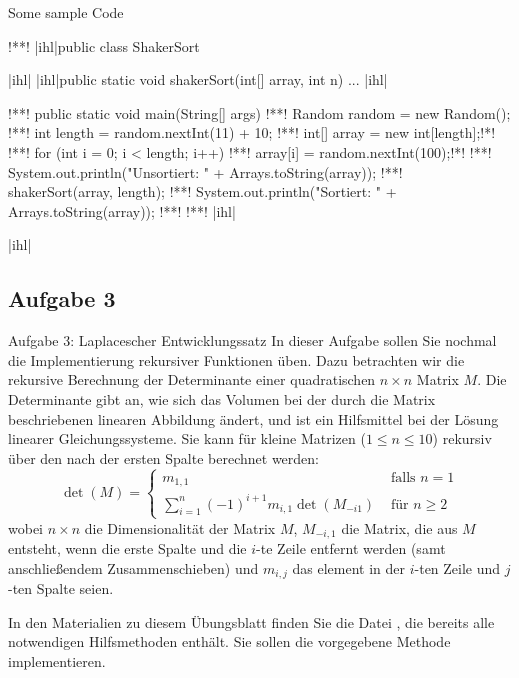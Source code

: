 \begin{frame}[c,fragile]{Some sample Code}
\SetupLstHl
\begin{plainjava}
!**!
|ihl|public class ShakerSort {|ihl|
    |ihl|public static void shakerSort(int[] array, int n) { ... }|ihl|

!**!    public static void main(String[] args) {
!**!        Random random = new Random();
!**!        int length = random.nextInt(11) + 10;
!**!        int[] array = new int[length];!*\smallskip*!
!**!        for (int i = 0; i < length; i++)
!**!           array[i] = random.nextInt(100);!*\smallskip*!
!**!        System.out.println("Unsortiert: " + Arrays.toString(array));
!**!        shakerSort(array, length);
!**!        System.out.println("Sortiert: " + Arrays.toString(array));
!**!    }!**!
|ihl|}|ihl|
\end{plainjava}
\end{frame}

\subsection{Aufgabe 3}
\begin{frame}[c]{Aufgabe 3: Laplacescher Entwicklungssatz}
    In dieser Aufgabe sollen Sie nochmal die Implementierung rekursiver Funktionen üben. Dazu betrachten wir die
    rekursive Berechnung der Determinante einer quadratischen \(n \times n\) Matrix \(M\). Die Determinante gibt an, wie sich
    das Volumen bei der durch die Matrix beschriebenen linearen Abbildung ändert, und ist ein Hilfsmittel bei der
    Lösung linearer Gleichungssysteme. Sie kann für kleine Matrizen (\(1 \leq n \leq 10\)) rekursiv über den  nach der ersten Spalte berechnet werden:
    \begin{equation*}
        \det(M) = \begin{cases}
            m_{1,1} & \text{ falls } n = 1\\
            \sum_{i = 1}^n (-1)^{i + 1} m_{i, 1} \det(M_{-i 1}) & \text{ für } n \geq 2
        \end{cases}
    \end{equation*}
    wobei \(n \times n\) die Dimensionalität der Matrix \(M\), \(M_{-i, 1}\) die Matrix, die aus \(M\) entsteht, wenn die erste Spalte und die \(i\)-te Zeile entfernt werden (samt anschließendem Zusammenschieben) und \(m_{i, j}\) das element in der \(i\)-ten Zeile und \(j\)-ten Spalte seien.

    In den Materialien zu diesem Übungsblatt finden Sie die Datei , die bereits alle notwendigen
    Hilfsmethoden enthält. Sie sollen die vorgegebene Methode  implementieren.
\endtaskblock
\end{frame}

